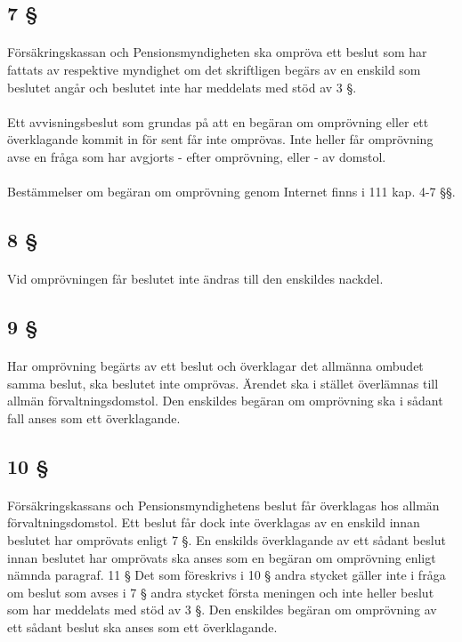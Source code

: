 \documentclass[a4paper,notitlepage,openany,10pt]{book}
\begin{document}
\subsection*{7 §}
\paragraph*{}
Försäkringskassan och Pensionsmyndigheten ska ompröva ett beslut som har fattats av respektive myndighet om det skriftligen begärs av en enskild som beslutet angår och beslutet inte har meddelats med stöd av 3 §.
\paragraph*{}
Ett avvisningsbeslut som grundas på att en begäran om omprövning eller ett överklagande kommit in för sent får inte omprövas. Inte heller får omprövning avse en fråga som har avgjorts
\newline - efter omprövning, eller
\newline - av domstol.
\paragraph*{}
Bestämmelser om begäran om omprövning genom Internet finns i 111 kap. 4-7 §§.
\subsection*{8 §}
\paragraph*{}
Vid omprövningen får beslutet inte ändras till den enskildes nackdel.
\subsection*{9 §}
\paragraph*{}
Har omprövning begärts av ett beslut och överklagar det allmänna ombudet samma beslut, ska beslutet inte omprövas.
Ärendet ska i stället överlämnas till allmän förvaltningsdomstol. Den enskildes begäran om omprövning ska i sådant fall anses som ett överklagande.
\subsection*{10 §}
\paragraph*{}
Försäkringskassans och Pensionsmyndighetens beslut får överklagas hos allmän förvaltningsdomstol.
Ett beslut får dock inte överklagas av en enskild innan beslutet har omprövats enligt 7 §. En enskilds överklagande av ett sådant beslut innan beslutet har omprövats ska anses som en begäran om omprövning enligt nämnda paragraf. 11 § Det som föreskrivs i 10 § andra stycket gäller inte i fråga om beslut som avses i 7 § andra stycket första meningen och inte heller beslut som har meddelats med stöd av 3 §. Den enskildes begäran om omprövning av ett sådant beslut ska anses som ett överklagande.
\end{document}
